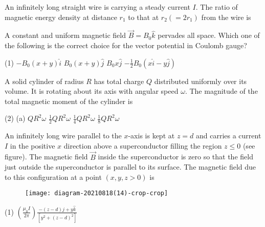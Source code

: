 \begin{enumerate}
\begin{minipage}{\textwidth}
	\item An infinitely long straight wire is carrying a steady current $I$. The ratio of magnetic energy density at distance $r_{1}$ to that at $r_{2}\left(=2 r_{1}\right)$ from the wire is
\end{minipage}
\begin{minipage}{\textwidth}
	\item A constant and uniform magnetic field $\vec{B}=B_{0} \hat{k}$ pervades all space. Which one of the following is the correct choice for the vector potential in Coulomb gauge?
\end{minipage}
\begin{tasks}(1)
	\task[\textbf{A.}] $-B_{0}(x+y) \hat{i}$
	\task[\textbf{B.}]$B_{0}(x+y) \hat{j}$
	\task[\textbf{C.}] $B_{0} x \hat{j}$
	\task[\textbf{D.}]$-\frac{1}{2} B_{0}(x \hat{i}-y \hat{j})$
\end{tasks}
\begin{minipage}{\textwidth}
	\item  A solid cylinder of radius $R$ has total charge $Q$ distributed uniformly over its volume. It is rotating about its axis with angular speed $\omega$. The magnitude of the total magnetic moment of the cylinder is
\end{minipage}
\begin{tasks}(2)
	\task[\textbf{A.}](a) $Q R^{2} \omega$
	\task[\textbf{B.}]$\frac{1}{2} Q R^{2} \omega$
	\task[\textbf{C.}]$\frac{1}{4} Q R^{2} \omega$
	\task[\textbf{D.}]$\frac{1}{8} Q R^{2} \omega$
\end{tasks}
\begin{minipage}{\textwidth}
	\item An infinitely long wire parallel to the $x$-axis is kept at $z=d$ and carries a current $I$ in the positive $x$ direction above a superconductor filling the region $z \leq 0$ (see figure). The magnetic field $\vec{B}$ inside the superconductor is zero so that the field just outside the superconductor is parallel to its surface. The magnetic field due to this configuration at a point $(x, y, z>0)$ is
	\begin{figure}[H]
		\centering
		\texttt{[image: diagram-20210818(14)-crop-crop]}
		\caption{}
		\label{}
	\end{figure}
\end{minipage}
\begin{tasks}(1)
	\task[\textbf{A.}]$\left(\frac{\mu_{0} I}{2 \pi}\right) \frac{-(z-d) \hat{j}+y \hat{k}}{\left[y^{2}+(z-d)^{2}\right]}$

\end{tasks}
\end{enumerate}
